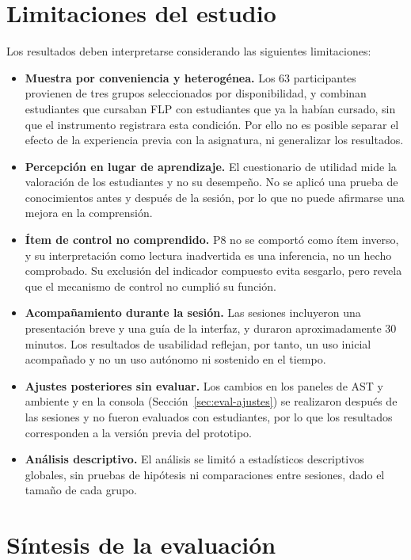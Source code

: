 \section{Limitaciones del estudio}
\label{sec:eval-limitaciones}

Los resultados deben interpretarse considerando las siguientes limitaciones:

\begin{itemize}
    \item \textbf{Muestra por conveniencia y heterogénea.} Los 63 participantes provienen de tres grupos seleccionados por disponibilidad, y combinan estudiantes que cursaban FLP con estudiantes que ya la habían cursado, sin que el instrumento registrara esta condición. Por ello no es posible separar el efecto de la experiencia previa con la asignatura, ni generalizar los resultados.
    \item \textbf{Percepción en lugar de aprendizaje.} El cuestionario de utilidad mide la valoración de los estudiantes y no su desempeño. No se aplicó una prueba de conocimientos antes y después de la sesión, por lo que no puede afirmarse una mejora en la comprensión.
    \item \textbf{Ítem de control no comprendido.} P8 no se comportó como ítem inverso, y su interpretación como lectura inadvertida es una inferencia, no un hecho comprobado. Su exclusión del indicador compuesto evita sesgarlo, pero revela que el mecanismo de control no cumplió su función.
    \item \textbf{Acompañamiento durante la sesión.} Las sesiones incluyeron una presentación breve y una guía de la interfaz, y duraron aproximadamente 30 minutos. Los resultados de usabilidad reflejan, por tanto, un uso inicial acompañado y no un uso autónomo ni sostenido en el tiempo.
    \item \textbf{Ajustes posteriores sin evaluar.} Los cambios en los paneles de AST y ambiente y en la consola (Sección~\ref{sec:eval-ajustes}) se realizaron después de las sesiones y no fueron evaluados con estudiantes, por lo que los resultados corresponden a la versión previa del prototipo.
    \item \textbf{Análisis descriptivo.} El análisis se limitó a estadísticos descriptivos globales, sin pruebas de hipótesis ni comparaciones entre sesiones, dado el tamaño de cada grupo.
\end{itemize}

\section{Síntesis de la evaluación}

